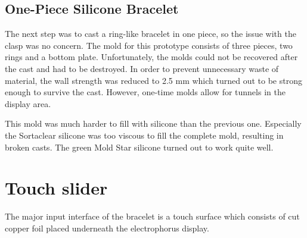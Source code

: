 \subsection{One-Piece Silicone Bracelet}
The next step was to cast a ring-like bracelet in one piece, so the issue with the clasp was no concern. The mold for this prototype consists of three pieces, two rings and a bottom plate. Unfortunately, the molds could not be recovered after the cast and had to be destroyed. In order to prevent unnecessary waste of material, the wall strength was reduced to 2.5 mm which turned out to be strong enough to survive the cast. However, one-time molds allow for tunnels in the display area.

This mold was much harder to fill with silicone than the previous one. Especially the Sortaclear silicone was too viscous to fill the complete mold, resulting in broken casts. The green Mold Star silicone turned out to work quite well.

\section{Touch slider}
The major input interface of the bracelet is a touch surface which consists of cut copper foil placed underneath the electrophorus display.
 
